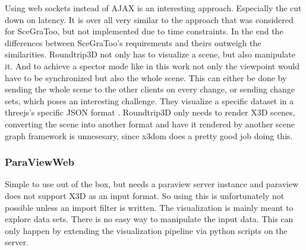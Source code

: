 Using web sockets instead of AJAX is an interesting approach.
\cite{Marion:2012:RCS:2338714.2338721} Especially the cut down on latency. It is
over all very similar to the approach that was considered for SceGraToo, but not
implemented due to time constraints. In the end the differences between
SceGraToo's requirements and theirs outweigh the similarities. \gls{Roundtrip3D} not only
has to visualize a scene, but also manipulate it. And to achieve a spector mode
like in this work not only the viewpoint would have to be synchronized but also
the whole scene. This can either be done by sending the whole scene to the other
clients on every change, or sending change sets, which poses an interesting
challenge. They visualize a specific dataset in a threejs's specific \gls{JSON} format
\cite{threejs-format}. \gls{Roundtrip3D} only needs to render \gls{X3D} scenes, converting the
scene into another format and have it rendered by another scene graph framework
is unnesesary, since x3dom does a pretty good job doing this.

\subsubsection{ParaViewWeb}
\label{paraviewweb-pvweb}

Simple to use out of the box, but needs a paraview server instance and
paraview does not support \gls{X3D} as an input format. So using this is unfortunately
not possible unless an import filter is written. The visualization is
mainly meant to explore data sets. There is no easy way to manipulate
the input data. This can only happen by extending the visualization
pipeline via python scripts on the server.
